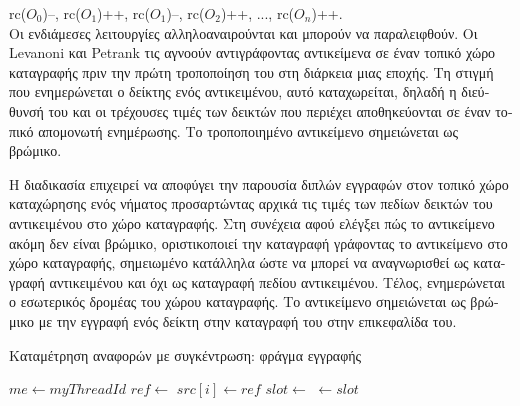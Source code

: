 \begin{greek}
rc($O_0$)--, rc($O_1$)++, rc($O_1$)--, rc($O_2$)++, ..., rc($O_n$)++.\\

Οι ενδιάμεσες λειτουργίες αλληλοαναιρούνται και μπορούν να
παραλειφθούν. Οι Levanoni και Petrank \cite{levanoni1999scalable} 
τις αγνοούν αντιγράφοντας αντικείμενα σε έναν τοπικό χώρο
καταγραφής πριν την πρώτη τροποποίηση του στη διάρκεια μιας
εποχής. Τη στιγμή που ενημερώνεται ο δείκτης ενός αντικειμένου,
αυτό καταχωρείται, δηλαδή η διεύθυνσή του και οι τρέχουσες
τιμές των δεικτών που περιέχει αποθηκεύονται σε έναν τοπικό
απομονωτή ενημέρωσης. Το τροποποιημένο αντικείμενο σημειώνεται
ως βρώμικο.

Η διαδικασία  επιχειρεί να αποφύγει την
παρουσία διπλών εγγραφών στον τοπικό χώρο καταχώρησης ενός
νήματος προσαρτώντας αρχικά τις τιμές των πεδίων δεικτών
του αντικειμένου στο χώρο καταγραφής. Στη συνέχεια αφού
ελέγξει πώς το αντικείμενο ακόμη δεν είναι βρώμικο,
οριστικοποιεί την καταγραφή γράφοντας το αντικείμενο στο
χώρο καταγραφής, σημειωμένο κατάλληλα ώστε να μπορεί να
αναγνωρισθεί ως καταγραφή αντικειμένου και όχι ως καταγραφή
πεδίου αντικειμένου. Τέλος, ενημερώνεται ο εσωτερικός δρομέας
του χώρου καταγραφής. Το αντικείμενο σημειώνεται ως βρώμικο
με την εγγραφή ενός δείκτη στην καταγραφή του στην επικεφαλίδα
του. 

\begin{algorithm}[H]
  \caption{Καταμέτρηση αναφορών με συγκέντρωση: φράγμα εγγραφής}
  \begin{algorithmic}[1]
    \State $me \gets myThreadId$
    \Statex
      \State $ref \gets$ 
        \State {}
      \EndIf
      \State $src[i] \gets ref$
    \EndProcedure
    \Statex
          \State {}
        \EndIf
      \EndFor
        \State $slot \gets$ 
        \State {}
      \EndIf  
    \EndProcedure
    \Statex
      \State {}
    \EndFunction
    \Statex
      \State {} $\gets slot$ 
    \EndProcedure
  \end{algorithmic}
\end{algorithm}


\end{greek}
